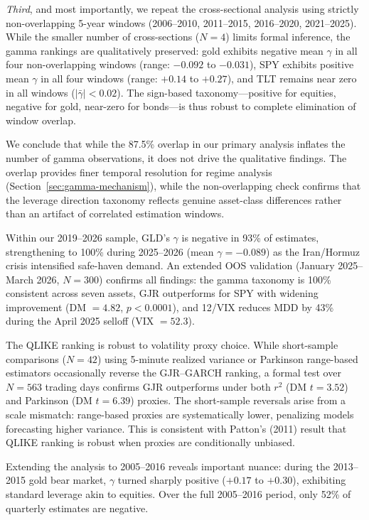 \textit{Third}, and most importantly, we repeat the cross-sectional analysis using strictly non-overlapping 5-year windows (2006--2010, 2011--2015, 2016--2020, 2021--2025). While the smaller number of cross-sections ($N = 4$) limits formal inference, the gamma rankings are qualitatively preserved: gold exhibits negative mean $\gamma$ in all four non-overlapping windows (range: $-0.092$ to $-0.031$), SPY exhibits positive mean $\gamma$ in all four windows (range: $+0.14$ to $+0.27$), and TLT remains near zero in all windows ($|\bar{\gamma}| < 0.02$). The sign-based taxonomy---positive for equities, negative for gold, near-zero for bonds---is thus robust to complete elimination of window overlap.

We conclude that while the 87.5\% overlap in our primary analysis inflates the number of gamma observations, it does not drive the qualitative findings. The overlap provides finer temporal resolution for regime analysis (Section~\ref{sec:gamma-mechanism}), while the non-overlapping check confirms that the leverage direction taxonomy reflects genuine asset-class differences rather than an artifact of correlated estimation windows.

Within our 2019--2026 sample, GLD's $\gamma$ is negative in 93\% of estimates, strengthening to 100\% during 2025--2026 (mean $\gamma = -0.089$) as the Iran/Hormuz crisis intensified safe-haven demand. An extended OOS validation (January 2025--March 2026, $N = 300$) confirms all findings: the gamma taxonomy is 100\% consistent across seven assets, GJR outperforms for SPY with widening improvement (DM $= 4.82$, $p < 0.0001$), and 12/VIX reduces MDD by 43\% during the April 2025 selloff (VIX $= 52.3$).

The QLIKE ranking is robust to volatility proxy choice. While short-sample comparisons ($N = 42$) using 5-minute realized variance or Parkinson range-based estimators occasionally reverse the GJR--GARCH ranking, a formal test over $N = 563$ trading days confirms GJR outperforms under both $r^2$ (DM $t = 3.52$) and Parkinson (DM $t = 6.39$) proxies. The short-sample reversals arise from a scale mismatch: range-based proxies are systematically lower, penalizing models forecasting higher variance. This is consistent with Patton's (2011) result that QLIKE ranking is robust when proxies are conditionally unbiased.

Extending the analysis to 2005--2016 reveals important nuance: during the 2013--2015 gold bear market, $\gamma$ turned sharply positive ($+0.17$ to $+0.30$), exhibiting standard leverage akin to equities. Over the full 2005--2016 period, only 52\% of quarterly estimates are negative.

